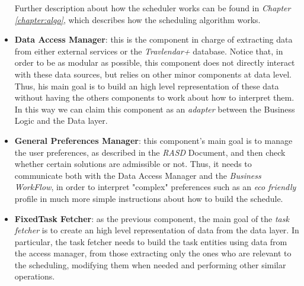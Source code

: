 \begin{itemize}
\begin{itemize}
            \end{itemize}
            
    Further description about how the scheduler works can be found in \emph{Chapter \ref{chapter:algo}}, which describes how the scheduling algorithm works.
    
    \item \textbf{Data Access Manager}: this is the component in charge of extracting data from either external services or the \emph{Travlendar+} database. Notice that, in order to be as modular as possible, this component does not directly interact with these data sources, but relies on other minor components at data level. Thus, his main goal is to build an high level representation of these data without having the others components to work about how to interpret them. In this way we can claim this component as an \emph{adapter} between the Business Logic and the Data layer.
    
    \item \textbf{General Preferences Manager}: this component's main goal is to manage the user preferences, as described in the \emph{RASD} Document, and then check whether certain solutions are admissible or not. Thus, it needs to communicate both with the Data Access Manager and the \emph{Business WorkFlow}, in order to interpret "complex" preferences such as an \emph{eco friendly} profile in much more simple instructions about how to build the  
    schedule.
    
    \item \textbf{FixedTask Fetcher}: as the previous component, the main goal of the \emph{task fetcher} is to create an high level representation of data from the data layer. In particular, the task fetcher needs to build the task entities using data from the access manager, from those extracting only the ones who are relevant to the scheduling, modifying them when needed and performing other similar operations.
\end{itemize}

